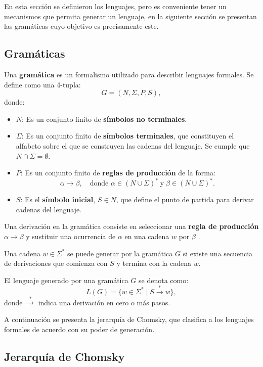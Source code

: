 En esta sección se definieron los lenguajes, pero es conveniente tener un mecanismos que permita generar un lenguaje,
en la siguiente sección se presentan las gramáticas cuyo objetivo es precisamente este.

\subsection{Gramáticas}
\label{sec:grammars}

Una \textbf{gramática} es un formalismo utilizado para describir lenguajes formales. Se define como una 4-tupla:
\[
  G = (N, \Sigma, P, S),
\]
donde:
\begin{itemize}
  \item \(N\): Es un conjunto finito de \textbf{símbolos no terminales}.
  \item \(\Sigma\): Es un conjunto finito de \textbf{símbolos terminales}, que constituyen el alfabeto sobre el que se construyen las cadenas del lenguaje. Se cumple que \(N \cap \Sigma = \emptyset\).
  \item \(P\): Es un conjunto finito de \textbf{reglas de producción} de la forma:
        \[
          \alpha \to \beta, \quad \text{donde } \alpha \in (N \cup \Sigma)^* \;\text{y}\; \beta \in (N \cup \Sigma)^*.
        \]
        
  \item \(S\): Es el \textbf{símbolo inicial}, \(S \in N\), que define el punto de partida para derivar cadenas del lenguaje.
\end{itemize}

Una derivación en la gramática consiste en seleccionar una \textbf{regla de producción} $\alpha \to \beta$ y sustituir una ocurrencia de 
$\alpha$ en una cadena $w$ por $\beta$ \cite{authomataTheory}.

Una cadena $w\in\Sigma^*$  se puede generar por la gramática $G$ si existe una secuencia de derivaciones que comienza con $S$
y termina con la cadena $w$.

El lenguaje generado por una gramática \(G\) se denota como:
\[
  L(G) = \{ w \in \Sigma^* \mid S \overset{*}{\to} w \},
\]
donde \(\overset{*}{\to}\) indica una derivación en cero o más pasos.

A continuación se presenta la jerarquía de Chomsky, que clasifica a los lenguajes formales de acuerdo con su poder de generación.

\subsection{Jerarquía de Chomsky}

